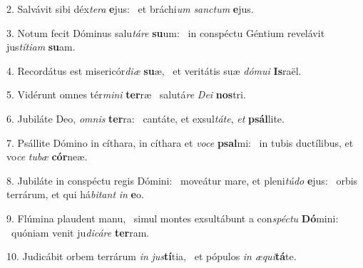 2. Salvávit sibi déx\textit{te}\textit{ra} \textbf{e}jus: \ast\  et bráchi\textit{um} \textit{sanc}\textit{tum} \textbf{e}jus.\

3. Notum fecit Dóminus salu\textit{tá}\textit{re} \textbf{su}um: \ast\  in conspéctu Géntium revelávit jus\textit{tí}\textit{ti}\textit{am} \textbf{su}am.\

4. Recordátus est misericór\textit{di}\textit{æ} \textbf{su}æ, \ast\  et veritátis suæ \textit{dó}\textit{mu}\textit{i} \textbf{Is}raël.\

5. Vidérunt omnes tér\textit{mi}\textit{ni} \textbf{ter}ræ \ast\  salutá\textit{re} \textit{De}\textit{i} \textbf{nos}tri.\

6. Jubiláte Deo, \textit{om}\textit{nis} \textbf{ter}ra: \ast\  cantáte, et exsul\textit{tá}\textit{te}, \textit{et} \textbf{psál}lite.\

7. Psállite Dómino in cíthara, in cíthara et \textit{vo}\textit{ce} \textbf{psal}mi: \ast\  in tubis ductílibus, et vo\textit{ce} \textit{tu}\textit{bæ} \textbf{cór}neæ.\

8. Jubiláte in conspéctu regis Dómini: \dag\  moveátur mare, et pleni\textit{tú}\textit{do} \textbf{e}jus: \ast\  orbis terrárum, et qui há\textit{bi}\textit{tant} \textit{in} \textbf{e}o.\

9. Flúmina plaudent manu, \dag\  simul montes exsultábunt a con\textit{spéc}\textit{tu} \textbf{Dó}mini: \ast\  quóniam venit ju\textit{di}\textit{cá}\textit{re} \textbf{ter}ram.\

10. Judicábit orbem terrárum \textit{in} \textit{jus}\textbf{tí}tia, \ast\  et pópulos \textit{in} \textit{æ}\textit{qui}\textbf{tá}te.\


